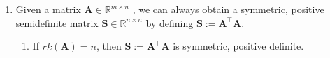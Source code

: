 \begin{enumerate}
    \item 
    \begin{theorem}
        Given a matrix $\bm{A} \in \mathbb{R}^{m\times n}$ , we can always obtain a symmetric, positive semidefinite matrix $\bm{S} \in \mathbb{R}^{n\times n}$ by defining $\bm{S} := \bm{A}^\top \bm{A}$.
        \hfill \cite{mfml/book/mml/Deisenroth-Faisal-Ong}
    \end{theorem}
    \begin{enumerate}
        \item If $rk(\bm{A}) = n$, then $\bm{S} := \bm{A}^\top \bm{A}$ is symmetric, positive definite.
        \hfill \cite{mfml/book/mml/Deisenroth-Faisal-Ong}
    \end{enumerate}
\end{enumerate}














